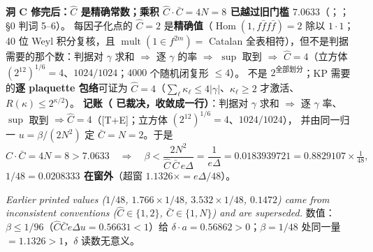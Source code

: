 \LM{} \textbf{洞 C 修完后：$\hat C$ 是精确常数；乘积 $\hat C\cdot\bar C=4N=8$ 已越过旧门槛 $7.0633$}（；； \S0 判词 5--6）。
每因子化点的 $\hat C=2$ 是\textbf{精确值}（$\operatorname{Hom}(1,f\bar f f\bar f)=2$ 除以 $1\cdot1$；40 位 Weyl 积分复核，且 $\operatorname{mult}(1\in f^{2m})=$ Catalan 全表相符），但不是判据需要的那个数：判据对 $\gamma$ 求和 $\Rightarrow$ 逐 $\gamma$ 的率 $\Rightarrow$ $\sup$ 取到 $\Rightarrow$ \textbf{$\hat C=4$}（立方体 $(2^{12})^{1/6}=4$、$1024/1024$；$4000$ 个随机闭复形 $\le4$）。
不是 $2^{\text{全部划分}}$；KP 需要的\textbf{逐 plaquette 包络}可证为 $\hat C=4$（$\sum_\ell\kappa_\ell\le4|\gamma|$、$\kappa_\ell\ge2$ 才激活、$R(\kappa)\le2^{\kappa/2}$）。
\textbf{记账（ 已裁决，收敛成一行）}：判据对 $\gamma$ 求和 $\Rightarrow$ 逐 $\gamma$ 率、$\sup$ 取到 $\Rightarrow\hat C=4$（[T+E]；立方体 $(2^{12})^{1/6}=4$、$1024/1024$），
并由同一归一 $u=\beta/(2N^2)$ 定 $\bar C=N=2$。于是
\begin{equation}
\hat C\cdot\bar C=4N=8>7.0633
\quad\Longrightarrow\quad
\beta<\frac{2N^2}{\hat C\,\bar C\,e\Delta}=\frac{1}{e\Delta}=0.0183939721=0.8829107\times\tfrac1{48},
\label{eq:window}
\end{equation}
\textbf{$1/48=0.0208333$ 在窗外}（超窗 $1.1326\times=e\Delta/48$）。\LT
\par\smallskip
\emph{Earlier printed values ($1/48$, $1.766\times1/48$, $3.532\times1/48$, $0.1472$) came from inconsistent conventions ($\hat C\in\{1,2\}$, $\bar C\in\{1,N\}$) and are superseded.}
数值：$\beta\le1/96$（$\hat C\bar Ce\Delta u=0.56631<1$）给 $\delta\cdot a=0.56862>0$；$\beta=1/48$ 处同一量 $=1.1326>1$，$\delta$ 读数无意义。
